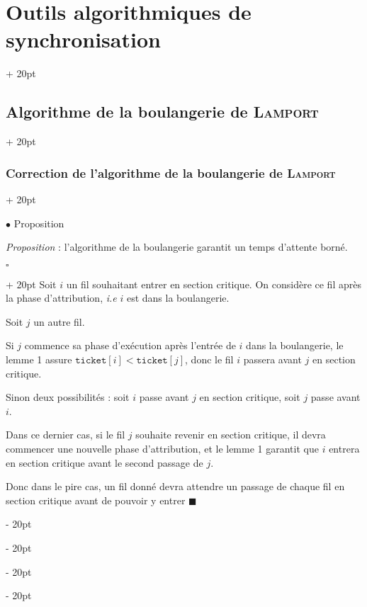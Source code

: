 \documentclass[a4paper, 12pt, twoside]{article}
\newcommand{\ind}[1][20pt]{\advance\leftskip + #1}
\newcommand{\deind}[1][20pt]{\advance\leftskip - #1}
\newenvironment{indt}[2][20pt]{#2 \par \ind[#1]}{\par \deind} %
\newenvironment{proof}[1][{}]{\begin{indt}{$\square$ #1}}{$\blacksquare$ \end{indt}}
\begin{document}
\begin{indt}{\section{Outils algorithmiques de synchronisation}}
\begin{indt}{\subsection{Algorithme de la boulangerie de \textsc{Lamport}}}
\begin{indt}{\subsubsection{Correction de l'algorithme de la boulangerie de \textsc{Lamport}}}
                \vspace{12pt}
                
                $\bullet$ Proposition

                \begin{emphBox}
                    \textit{Proposition} :
                    l'algorithme de la boulangerie garantit un temps d'attente borné.
                \end{emphBox}

                \vspace{6pt}
                
                \begin{proof}
                    Soit $i$ un fil souhaitant entrer en section critique. On considère ce fil après la phase d'attribution, \textit{i.e} $i$ est dans la boulangerie.

                    Soit $j$ un autre fil.

                    Si $j$ commence sa phase d'exécution après l'entrée de $i$ dans la boulangerie, le lemme 1 assure $\mathtt{ticket}[i] < \mathtt{ticket}[j]$, donc le fil $i$ passera avant $j$ en section critique.

                    Sinon deux possibilités : soit $i$ passe avant $j$ en section critique, soit $j$ passe avant $i$.

                    Dans ce dernier cas, si le fil $j$ souhaite revenir en section critique, il devra commencer une nouvelle phase d'attribution, et le lemme 1 garantit que $i$ entrera en section critique avant le second passage de $j$.

                    Donc dans le pire cas, un fil donné devra attendre un passage de chaque fil en section critique avant de pouvoir y entrer
                \end{proof}
            \end{indt}
        \end{indt}
    \end{indt}

    \vspace{12pt}
    
\end{document}
